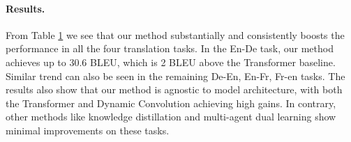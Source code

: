 \documentclass{article}
\begin{document}
\begin{figure}[!t]
\begin{minipage}[t]{0.485\textwidth}
\label{table:data_diverse_iwslt}
\vspace{-1em}
\end{minipage}
\end{figure}


\vspace{-0.5em}
\paragraph{Results.} {From Table \ref{table:data_diverse_iwslt} we see that 
our method substantially and consistently boosts the performance in all the four translation  tasks.} In the En-De task, our method achieves up to 30.6 BLEU, which is 2 BLEU above the Transformer baseline. Similar trend can also be seen in the remaining De-En, En-Fr, Fr-en tasks.
The results also show that our method is agnostic to model architecture, with both the Transformer and Dynamic Convolution achieving high gains. In contrary, other methods like knowledge distillation and multi-agent dual learning show minimal improvements on these tasks.
\end{document}

